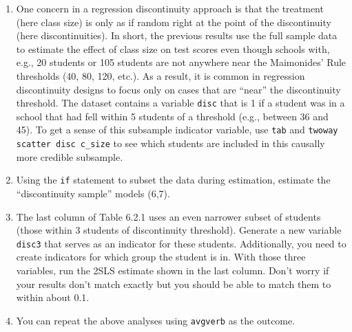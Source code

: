\documentclass[a4paper,12pt]{article}
\begin{document}
\begin{enumerate}
\item One concern in a regression discontinuity approach is that the treatment (here class size) is only as if random right at the point of the discontinuity (here discontinuities). In short, the previous results use the full sample data to estimate the effect of class size on test scores even though schools with, e.g., 20 students or 105 students are not anywhere near the Maimonides' Rule thresholds (40, 80, 120, etc.). As a result, it is common in regression discontinuity designs to focus only on cases that are ``near'' the discontinuity threshold. The dataset contains a variable \texttt{disc} that is 1 if a student was in a school that had fell within 5 students of a threshold (e.g., between 36 and 45). To get a sense of this subsample indicator variable, use \texttt{tab} and \texttt{twoway scatter disc c\_size} to see which students are included in this causally more credible subsample.
\item Using the \texttt{if} statement to subset the data during estimation, estimate the ``discontinuity sample'' models (6,7).
\item The last column of Table 6.2.1 uses an even narrower subset of students (those within 3 students of discontinuity threshold). Generate a new variable \texttt{disc3} that serves as an indicator for these students. Additionally, you need to create indicators for which group the student is in. With those three variables, run the 2SLS estimate shown in the last column. Don't worry if your results don't match exactly but you should be able to match them to within about 0.1.

\item You can repeat the above analyses using \texttt{avgverb} as the outcome.

\end{enumerate}
\end{document}
